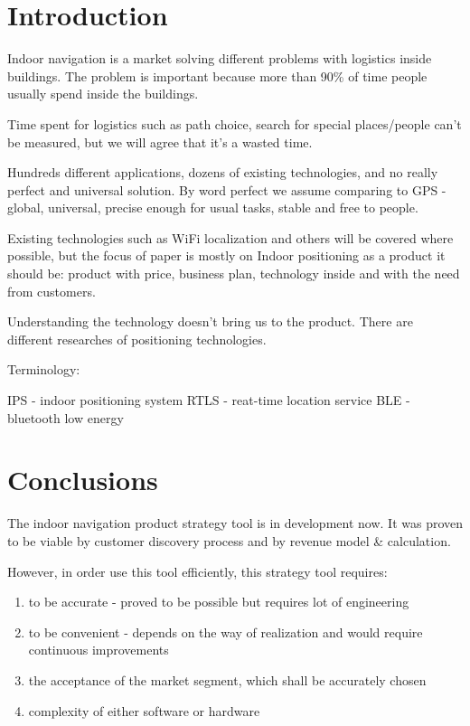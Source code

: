 \documentclass[conference]{IEEEtran}
\begin{document}
\section{Introduction}

Indoor navigation is a market solving different problems with logistics inside buildings. The problem is important because more than 90\% of time people usually spend inside the buildings\cite{Indoor_Generation}.

Time spent for logistics such as path choice, search for special places/people can't be measured, but we will agree that it's a wasted time.

Hundreds different applications, dozens of existing technologies, and no really perfect and universal solution. By word perfect we assume comparing to GPS - global, universal, precise enough for usual tasks, stable and free to people.

Existing technologies such as WiFi localization and others will be covered where possible, but the focus of paper is mostly on Indoor positioning as a product it should be: product with price, business plan, technology inside and with the need from customers.

Understanding the technology doesn't bring us to the product. There are different researches of positioning technologies\cite{Mautz2012IndoorPT, Sakpere2017ASS, Kj_fingerprinting, Brena2017}. 

Terminology:

IPS - indoor positioning system
RTLS - reat-time location service
BLE - bluetooth low energy





\section{Conclusions}

The indoor navigation product strategy tool is in development now.
It was proven to be viable by customer discovery process and by revenue model & calculation.

However, in order use this tool efficiently, this strategy tool requires:
\begin{enumerate}
    \item to be accurate - proved to be possible but requires lot of engineering
    \item to be convenient - depends on the way of realization and would require continuous improvements
    \item the acceptance of the market segment, which shall be accurately chosen 
    \item complexity of either software or hardware
\end{enumerate}
\end{document}
